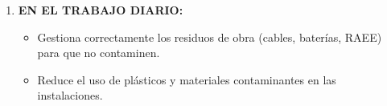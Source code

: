 \begin{solution}
\begin{enumerate}
	\item \textbf{EN EL TRABAJO DIARIO:}

\begin{itemize}
	\item{Gestiona correctamente los residuos de obra (cables, baterías, RAEE) para que no contaminen.}
	\item{Reduce el uso de plásticos y materiales contaminantes en las instalaciones.}
\end{itemize}

\end{enumerate}
\end{solution} 



